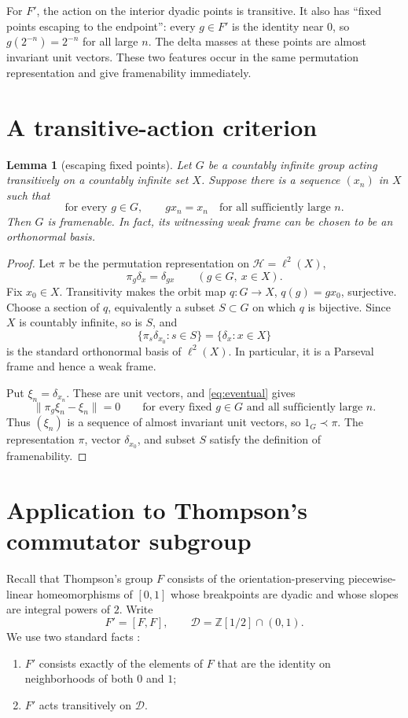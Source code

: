 \documentclass[11pt]{article}
\newtheorem{lemma}{Lemma}
\newcommand{\D}{\mathcal D}
\newcommand{\Hil}{\mathcal H}
\begin{document}
For $F'$, the action on the interior dyadic points is transitive.  It also has ``fixed points escaping to the endpoint'': every $g\in F'$ is the identity near $0$, so $g(2^{-n})=2^{-n}$ for all large $n$.  The delta masses at these points are almost invariant unit vectors.  These two features occur in the same permutation representation and give framenability immediately.

\section*{A transitive-action criterion}
\begin{lemma}[escaping fixed points]\label{lem:criterion}
Let $G$ be a countably infinite group acting transitively on a countably infinite set $X$.  Suppose there is a sequence $(x_n)$ in $X$ such that
\begin{equation}\label{eq:eventual}
 \text{for every }g\in G,\qquad gx_n=x_n\quad\text{for all sufficiently large }n.
\end{equation}
Then $G$ is framenable.  In fact, its witnessing weak frame can be chosen to be an orthonormal basis.
\end{lemma}

\begin{proof}
Let $\pi$ be the permutation representation on $\Hil=\ell^2(X)$,
\[
 \pi_g\delta_x=\delta_{gx}\qquad(g\in G,\ x\in X).
\]
Fix $x_0\in X$.  Transitivity makes the orbit map $q:G\to X$, $q(g)=gx_0$, surjective.  Choose a section of $q$, equivalently a subset $S\subset G$ on which $q$ is bijective.  Since $X$ is countably infinite, so is $S$, and
\[
 \{\pi_s\delta_{x_0}:s\in S\}=\{\delta_x:x\in X\}
\]
is the standard orthonormal basis of $\ell^2(X)$.  In particular, it is a Parseval frame and hence a weak frame.

Put $\xi_n=\delta_{x_n}$.  These are unit vectors, and \eqref{eq:eventual} gives
\[
 \|\pi_g\xi_n-\xi_n\|=0
 \qquad\text{for every fixed }g\in G\text{ and all sufficiently large }n.
\]
Thus $(\xi_n)$ is a sequence of almost invariant unit vectors, so $1_G\prec\pi$.  The representation $\pi$, vector $\delta_{x_0}$, and subset $S$ satisfy the definition of framenability.
\end{proof}

\section*{Application to Thompson's commutator subgroup}
Recall that Thompson's group $F$ consists of the orientation-preserving piecewise-linear homeomorphisms of $[0,1]$ whose breakpoints are dyadic and whose slopes are integral powers of $2$.  Write
\[
 F'=[F,F],\qquad \D=\mathbb Z[1/2]\cap(0,1).
\]
We use two standard facts \cite[Theorem 4.1 and Lemma 4.2]{CFP}:
\begin{enumerate}[leftmargin=2em]
\item $F'$ consists exactly of the elements of $F$ that are the identity on neighborhoods of both $0$ and $1$;
\item $F'$ acts transitively on $\D$.
\end{enumerate}
\end{document}
